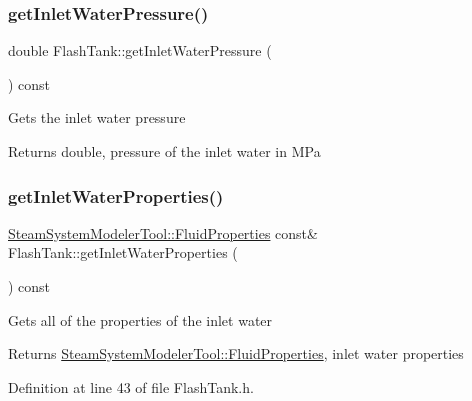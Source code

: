 \subsubsection{\texorpdfstring{get\+Inlet\+Water\+Pressure()}{getInletWaterPressure()}\hspace{0.1cm}{\footnotesize\ttfamily [3/3]}}
{\footnotesize\ttfamily double Flash\+Tank\+::get\+Inlet\+Water\+Pressure (\begin{DoxyParamCaption}{ }\end{DoxyParamCaption}) const}

Gets the inlet water pressure \begin{DoxyReturn}{Returns}
double, pressure of the inlet water in M\+Pa 
\end{DoxyReturn}
\mbox{\label{class_flash_tank_a582b3e730f1619891533965940d692de}} 
\subsubsection{\texorpdfstring{get\+Inlet\+Water\+Properties()}{getInletWaterProperties()}\hspace{0.1cm}{\footnotesize\ttfamily [1/3]}}
{\footnotesize\ttfamily \hyperlink{struct_steam_system_modeler_tool_1_1_fluid_properties}{Steam\+System\+Modeler\+Tool\+::\+Fluid\+Properties} const\& Flash\+Tank\+::get\+Inlet\+Water\+Properties (\begin{DoxyParamCaption}{ }\end{DoxyParamCaption}) const\hspace{0.3cm}{\ttfamily [inline]}}

Gets all of the properties of the inlet water \begin{DoxyReturn}{Returns}
\hyperlink{struct_steam_system_modeler_tool_1_1_fluid_properties}{Steam\+System\+Modeler\+Tool\+::\+Fluid\+Properties}, inlet water properties 
\end{DoxyReturn}


Definition at line 43 of file Flash\+Tank.\+h.

\mbox{\label{class_flash_tank_a582b3e730f1619891533965940d692de}} 
